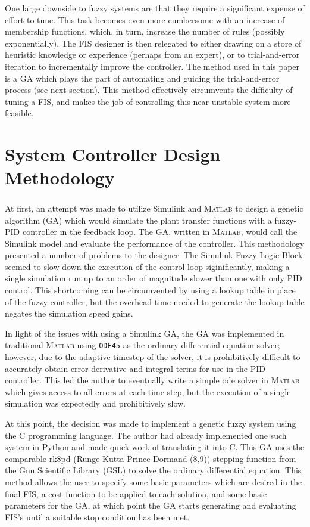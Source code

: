 One large downside to fuzzy systems are that they require a significant expense of effort to tune. This task
becomes even more cumbersome with an increase of membership functions, which, in turn, increase the number of
rules (possibly exponentially). The FIS designer is then relegated to either drawing on a store of heuristic
knowledge or experience (perhaps from an expert), or to trial-and-error iteration to incrementally improve the
controller. The method used in this paper is a GA which plays the part of automating and guiding the
trial-and-error process (see next section). This method effectively circumvents the difficulty of tuning a FIS,
and makes the job of controlling this near-unstable system more feasible.

\section{System Controller Design Methodology} At first, an attempt was made to utilize
Simulink\textsuperscript{\textregistered} and \textsc{Matlab}\textsuperscript{\textregistered} to design a
genetic algorithm (GA) which would simulate the plant transfer functions with a fuzzy-PID controller in the
feedback loop. The GA, written in \textsc{Matlab}, would call the Simulink model and evaluate the performance
of the controller. This methodology presented a number of problems to the designer. The Simulink Fuzzy Logic
Block seemed to slow down the execution of the control loop siginificantly, making a single simulation run up
to an order of magnitude slower than one with only PID control. This shortcoming can be circumvented by using
a lookup table in place of the fuzzy controller, but the overhead time needed to generate the lookup table
negates the simulation speed gains.

In light of the issues with using a Simulink GA, the GA was implemented in traditional \textsc{Matlab} using
\verb|ODE45| as the ordinary differential equation solver; however, due to the adaptive timestep of the
solver, it is prohibitively difficult to accurately obtain error derivative and integral terms for use in the
PID controller. This led the author to eventually write a simple ode solver in \textsc{Matlab} which
gives access to all errors at each time step, but the execution of a single simulation was expectedly and
prohibitively slow.

At this point, the decision was made to implement a genetic fuzzy system using  the C programming language.
The author had already implemented one such system in Python and made quick work of translating it into C.
This GA uses the comparable rk8pd (Runge-Kutta Prince-Dormand (8,9)) stepping function from the Gnu Scientific
Library (GSL) to solve the ordinary differential equation. This method allows the user to specify some basic
parameters which are desired in the final FIS, a cost function to be applied to each solution, and some basic
parameters for the GA, at which point the GA starts generating and evaluating FIS's until a suitable stop
condition has been met.

